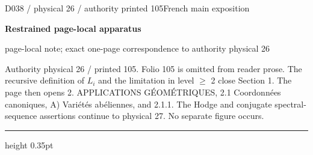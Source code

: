 \documentclass[9pt]{article}
\newcommand{\CanonText}[1]{\par{\fontsize{8.0}{9.35}\selectfont\RaggedRight #1\par}\vspace{2.2pt}}
\newcommand{\LayerTitle}{Restrained page-local apparatus}
\begin{document}
\noindent\begin{minipage}[t][\dimexpr\textheight-5pt\relax][t]{\textwidth}
{\sffamily\fontsize{7.3}{8.2}\selectfont\color{Quiet} D038 / physical 26 / authority printed 105\hfill French main exposition}
\par{}\vspace{4.5pt}
{\sffamily\fontsize{10.4}{11.6}\selectfont\bfseries\color{Accent} \LayerTitle}
\par{\sffamily\fontsize{6.7}{7.7}\selectfont\color{Quiet} page-local note; exact one-page correspondence to authority physical 26}
\vspace{5pt}
\CanonText{Authority physical 26 / printed 105. Folio 105 is omitted from reader prose. The recursive definition of \(L_{i}\) and the limitation in level \(\geq{}\) 2 close Section 1. The page then opens 2. APPLICATIONS GÉOMÉTRIQUES, 2.1 Coordonnées canoniques, A) Variétés abéliennes, and 2.1.1. The Hodge and conjugate spectral-sequence assertions continue to physical 27. No separate figure occurs.}
\vfill
{\color{Accent}\hrule height 0.35pt}\vspace{3pt}
\end{minipage}
\newpage
\end{document}
